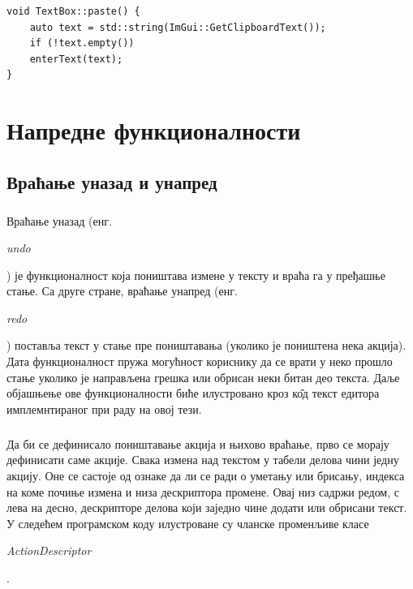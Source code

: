 \documentclass[12pt,oneside]{memoir}
\begin{document}
\begin{verbatim}
void TextBox::paste() {
	auto text = std::string(ImGui::GetClipboardText());
	if (!text.empty())
	enterText(text);
}
\end{verbatim}


\chapter{Напредне функционалности}
\section{Враћање уназад и унапред}
\paragraph{}
Враћање уназад (енг. \begin{latinica}\textit{undo}\end{latinica}) је функционалност
која поништава измене у тексту и враћа га у пређашње стање. Са друге стране,
враћање унапред (енг. \begin{latinica}\textit{redo}\end{latinica}) поставља текст у стање пре поништавања (уколико је поништена нека акција). Дата
функционалност пружа могућност кориснику да се врати у неко прошло стање
уколико је направљена грешка или обрисан неки битан део текста.
Даље објашњење ове функционалности биће илустровано кроз к\^{о}д текст едитора 
имплемнтираног при раду на овој тези.

\paragraph{}
Да би се дефинисало поништавање акција и њихово враћање, прво се морају дефинисати саме акције. Свака измена над текстом у табели делова чини једну
акцију. Оне се састоје од ознаке да ли се ради о уметању или брисању, индекса
на коме почиње измена и низа дескриптора промене. Овај низ садржи редом, 
с лева  на десно, дескрипторе делова који заједно чине додати или обрисани текст.
У следећем програмском коду илустроване су чланске променљиве класе 
\begin{latinica}\textit{ActionDescriptor}\end{latinica}.
\end{document}
